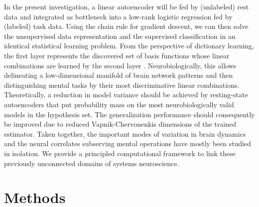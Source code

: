 \documentclass{article} %
\begin{document}
In the present investigation,
a linear autoencoder will be fed by (unlabeled) rest data and
integrated as bottleneck
into a low-rank logistic regression fed by (labeled) task data.
Using the chain rule for gradient descent, we can then
solve the unsupervised data representation and the supervised classification
in an identical statistical learning problem.
From the perspective of dictionary learning, the first layer represents
the discovered set of basis functions
whose linear combinations are learned
by the second layer \cite{olshausen96}.
%
Neurobiologically, this allows 
delineating a low-dimensional manifold of brain network patterns and then 
distinguishing mental tasks
by their most discriminative linear combinations.
%
Theoretically, a reduction in model variance should be achieved by
resting-state autoencoders that
put probability mass on the most neurobiologically
valid models in the hypothesis set.
%
The generalization performance should consequently be improved due to 
reduced Vapnik-Chervonenkis dimensions of the trained estimator.
%
Taken together,
the important modes of variation in brain dynamics and
the neural correlates subserving mental operations
have mostly been studied in isolation.
We provide a principled computational framework to link these previously
unconnected domains of systems neuroscience.


\section{Methods}
%
\end{document}
